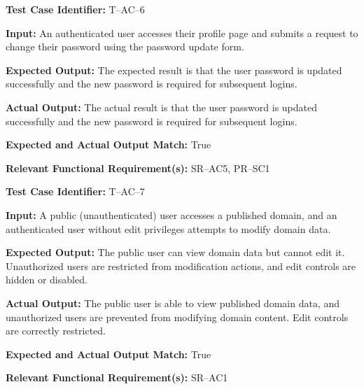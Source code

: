 \documentclass[12pt, titlepage]{article}
\begin{document}
\begin{mdframed}[linewidth=0.5mm]
\setlength{\parindent}{0pt}
\textbf{Test Case Identifier:} T--AC--6
\vspace{0.4em}

\textbf{Input:} An authenticated user accesses their profile page and submits a request to change their password using the password update form.
\vspace{0.4em}

\textbf{Expected Output:} The expected result is that the user password is updated successfully and the new password is required for subsequent logins.
\vspace{0.4em}

\textbf{Actual Output:} The actual result is that the user password is updated successfully and the new password is required for subsequent logins.
\vspace{0.4em}

\textbf{Expected and Actual Output Match:} True
\vspace{0.4em}

\textbf{Relevant Functional Requirement(s):} SR--AC5, PR--SC1
\end{mdframed}

\begin{mdframed}[linewidth=0.5mm]
\setlength{\parindent}{0pt}
\textbf{Test Case Identifier:} T--AC--7
\vspace{0.4em}

\textbf{Input:} A public (unauthenticated) user accesses a published domain, and an authenticated user without edit privileges attempts to modify domain data.
\vspace{0.4em}

\textbf{Expected Output:} The public user can view domain data but cannot edit it. Unauthorized users are restricted from modification actions, and edit controls are hidden or disabled.
\vspace{0.4em}

\textbf{Actual Output:} The public user is able to view published domain data, and unauthorized users are prevented from modifying domain content. Edit controls are correctly restricted.
\vspace{0.4em}

\textbf{Expected and Actual Output Match:} True
\vspace{0.4em}

\textbf{Relevant Functional Requirement(s):} SR--AC1
\end{mdframed}
\end{document}
